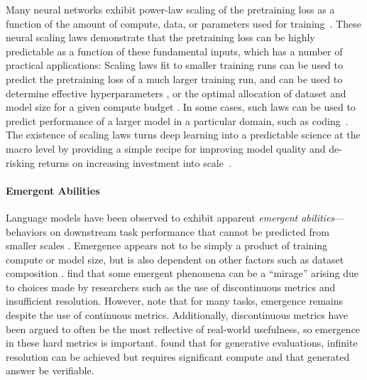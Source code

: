 Many neural networks exhibit power-law scaling of the pretraining loss as a function of the amount of compute, data, or parameters used for training~\citep{hestness2017deep, brown2020language, hoffmann2022training}. 
These neural scaling laws demonstrate that the pretraining loss can be highly predictable as a function of these fundamental inputs, which has a number of practical applications: Scaling laws fit to smaller training runs can be used to predict the pretraining loss of a much larger training run, and can be used to determine effective hyperparameters \citep{mccandlish2018empirical, deepseekai2024deepseek}, or the optimal allocation of dataset and model size for a given compute budget \citep{hoffmann2022training, muennighoff2024scaling, dey2023cerebrasgpt, sardana2023chinchillaoptimal, besiroglu2024chinchilla}. In some cases, such laws can be used to predict performance of a larger model in a particular domain, such as coding~\citep{openai2023gpt4}. The existence of scaling laws turns deep learning into a predictable science at the macro level by providing a simple recipe for improving model quality and de-risking returns on increasing investment into scale~\citep{ganguli2022predictability, bowman2023things}.

\paragraph{Emergent Abilities}

Language models have been observed to exhibit apparent \textit{emergent abilities}---behaviors on downstream task performance that cannot be predicted from smaller scales \citep{wei2022emergent, srivastava2022beyond}.
Emergence appears not to be simply a product of training compute or model size, but is also dependent on other factors such as dataset composition \citep{muckatira2024emergent, wei2022emergent}.
\citet{schaeffer2023mirage} find that some emergent phenomena can be a ``mirage'' arising due to choices made by researchers such as the use of discontinuous metrics and insufficient resolution. However, \citet{du2024understanding} note that for many tasks, emergence remains despite the use of continuous metrics. Additionally, discontinuous metrics have been argued to often be the most reflective of real-world usefulness, so emergence in these hard metrics is important. \citet{hu2024predicting} found that for generative evaluations, infinite resolution can be achieved but requires significant compute and that generated answer be verifiable.

